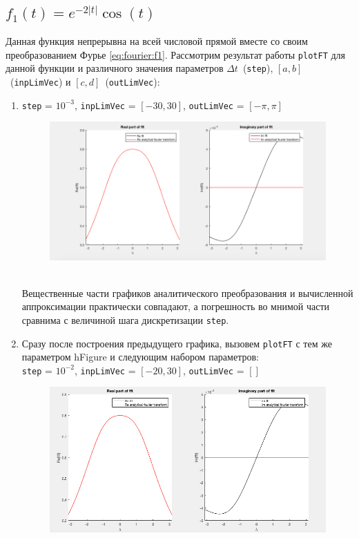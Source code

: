\documentclass[11pt, oneside, final]{article}
\numberwithin{equation}{section}
\begin{document}
    \subsection{\(f_1(t) = e^{-2|t|} \cos(t)\)} %
    \label{sub:f1}
    Данная функция непрерывна на всей числовой прямой вместе со своим преобразованием Фурье \eqref{eq:fourier:f1}. Рассмотрим результат работы \texttt{plotFT}
    для данной функции и различного значения параметров \(\Delta t\)~(\texttt{step}), \([a, b]\)~(\texttt{inpLimVec}) и \([c, d]\)~(\texttt{outLimVec}):
    \begin{enumerate}
        \item 
        \texttt{step} = \(10^{-3}\), \texttt{inpLimVec} = \( [-30, 30] \), \texttt{outLimVec} = \( [-\pi, \pi] \)
        \begin{figure}[!h]
            \centering
            \includegraphics[width=\textwidth]{f1fig1}
            \label{pic:f1:1}
        \end{figure} \\
        Вещественные части графиков аналитического преобразования и вычисленной аппроксимации практически совпадают, а погрешность во мнимой части сравнима с величиной
        шага дискретизации \texttt{step}.
        \clearpage
        \item
        Сразу после построения предыдущего графика, вызовем \texttt{plotFT} с тем же параметром hFigure и следующим набором параметров:\\
        \texttt{step} = \(10^{-2}\), \texttt{inpLimVec} = \( [-20, 30] \), \texttt{outLimVec} = \( [] \)
        \begin{figure}[!h]
            \centering
            \includegraphics[width=\textwidth]{f1fig2}

\end{figure}
\end{enumerate}
\end{document}

